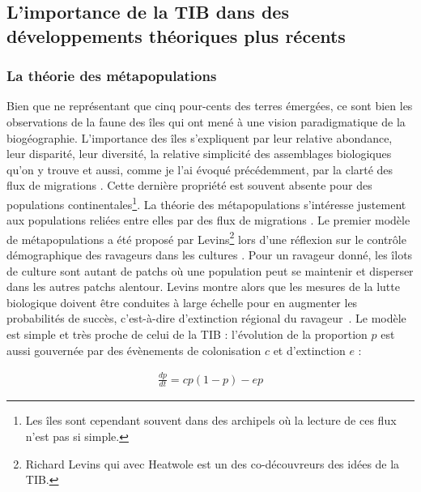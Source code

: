 \subsection*{L'importance de la TIB dans des développements théoriques
plus
récents}\label{limportance-de-la-tib-dans-des-duxe9veloppements-thuxe9oriques-plus-ruxe9cents}

\subsubsection*{La théorie des
métapopulations}\label{la-thuxe9orie-des-muxe9tapopulations}

Bien que ne représentant que cinq pour-cents des terres émergées, ce
sont bien les observations de la faune des îles qui ont mené à une
vision paradigmatique de la biogéographie. L'importance des îles
s'expliquent par leur relative abondance, leur disparité, leur
diversité, la relative simplicité des assemblages biologiques qu'on y
trouve et aussi, comme je l'ai évoqué précédemment, par la clarté des
flux de migrations \citep{Simberloff1974a}. Cette dernière propriété est
souvent absente pour des populations continentales\footnote{Les îles
  sont cependant souvent dans des archipels où la lecture de ces flux
  n'est pas si simple.}. La théorie des métapopulations s'intéresse
justement aux populations reliées entre elles par des flux de migrations
\citep{Hanski2010}. Le premier modèle de métapopulations a été proposé
par Levins\footnote{Richard Levins qui avec Heatwole est un des
  co-découvreurs des idées de la TIB.} lors d'une réflexion sur le
contrôle démographique des ravageurs dans les cultures
\citep{Levins1969}. Pour un ravageur donné, les îlots de culture sont
autant de patchs où une population peut se maintenir et disperser dans
les autres patchs alentour. Levins montre alors que les mesures de la
lutte biologique doivent être conduites à large échelle pour en
augmenter les probabilités de succès, c'est-à-dire d'extinction régional
du ravageur~\citep{Levins1969}. Le modèle est simple et très proche de
celui de la TIB : l'évolution de la proportion \(p\) est aussi gouvernée
par des évènements de colonisation \(c\) et d'extinction \(e\) :

\begin{eqnarray}
\label{eqMW}
\frac{dp}{dt} = cp(1-p)-ep
\end{eqnarray}

